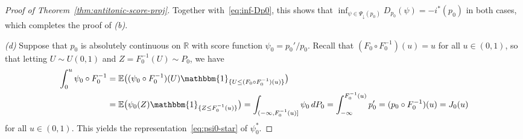 \documentclass[a4paper]{article}
\newcommand{\R}{\mathbb{R}}
\newcommand{\E}{\mathbb{E}}
\newcommand{\Ind}{\mathbbm{1}}
\theoremstyle{definition}
\begin{document}
\begin{proof}[Proof of Theorem~\ref{thm:antitonic-score-proj}]
Together with~\eqref{eq:inf-Dp0}, this shows that $\inf_{\psi \in \Psi_\downarrow(p_0)}D_{p_0}(\psi) = -i^*(p_0)$ in both cases, which completes the proof of \emph{(b)}.

\medskip
\noindent
\textit{(d)} Suppose that $p_0$ is absolutely continuous on $\R$ with score function $\psi_0 = p_0'/p_0$. Recall that
$(F_0 \circ F_0^{-1})(u) = u$ for all $u \in (0,1)$, so that letting $U \sim U(0,1)$ and $Z = F_0^{-1}(U) \sim P_0$, we have
\begin{align}
\label{eq:psi0-J0}
\int_0^u \psi_0 \circ F_0^{-1} &= \E\bigl((\psi_0 \circ F_0^{-1})(U) \Ind_{\{U \leq (F_0 \circ F_0^{-1})(u)\}}\bigr) \\
&= \E\bigl(\psi_0(Z) \Ind_{\{Z \leq F_0^{-1}(u)\}}\bigr) = \int_{(-\infty,F_0^{-1}(u)]} \psi_0\,dP_0 = \int_{-\infty}^{F_0^{-1}(u)} p_0' = (p_0 \circ F_0^{-1})(u) = J_0(u) \notag
\end{align}
for all $u \in (0,1)$. This yields the representation~\eqref{eq:psi0-star} of $\psi_0^*$.


\end{proof}
\end{document}
